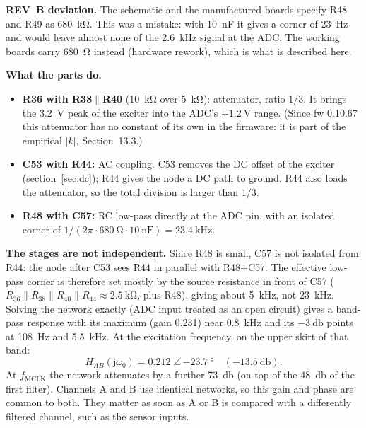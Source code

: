 \documentclass[11pt,a4paper]{article}
\begin{document}
\textbf{REV~B deviation.}  The schematic and the manufactured boards
specify R48 and R49 as \SI{680}{\kilo\ohm}.  This was a mistake: with
\SI{10}{\nano\farad} it gives a corner of \SI{23}{\hertz} and would leave
almost none of the \SI{2.6}{\kilo\hertz} signal at the ADC.  The working
boards carry \SI{680}{\ohm} instead (hardware rework), which is what is
described here.

\textbf{What the parts do.}
\begin{itemize}
  \item \textbf{R36 with R38$\parallel$R40} (\SI{10}{\kilo\ohm} over
        \SI{5}{\kilo\ohm}): attenuator, ratio $1/3$.  It brings the
        \SI{3.2}{\volt} peak of the exciter into the ADC's $\pm\SI{1.2}{\volt}$
        range.  (Since fw 0.10.67 this attenuator has no constant of its own in the
        firmware: it is part of the empirical $|k|$, Section~13.3.)
  \item \textbf{C53 with R44:} AC coupling.  C53 removes the DC offset of
        the exciter (section~\ref{sec:dc}); R44 gives the node a DC path to
        ground.  R44 also loads the attenuator, so the total division is
        larger than $1/3$.
  \item \textbf{R48 with C57:} RC low-pass directly at the ADC pin, with an
        isolated corner of $1/(2\pi\cdot\SI{680}{\ohm}\cdot\SI{10}{\nano\farad})
        = \SI{23.4}{\kilo\hertz}$.
\end{itemize}

\textbf{The stages are not independent.}  Since R48 is small, C57 is not
isolated from R44: the node after C53 sees R44 in parallel with R48+C57.  The
effective low-pass corner is therefore set mostly by the source resistance
in front of C57 ($R_{36}\parallel R_{38}\parallel R_{40}\parallel R_{44}
\approx\SI{2.5}{\kilo\ohm}$, plus R48), giving about \SI{5}{\kilo\hertz},
not \SI{23}{\kilo\hertz}.  Solving the network exactly (ADC input treated as
an open circuit) gives a band-pass response with its maximum
(gain 0.231) near \SI{0.8}{\kilo\hertz} and its $\SI{-3}{\decibel}$ points at
\SI{108}{\hertz} and \SI{5.5}{\kilo\hertz}.  At the excitation frequency,
on the upper skirt of that band:
\begin{equation}
  \boxed{H_{AB}(\mathrm{j}\omega_0) = 0.212\;\angle\,\SI{-23.7}{\degree}
  \quad(\SI{-13.5}{\decibel}).}
\end{equation}
At $f_{\mathrm{MCLK}}$ the network attenuates by a further
\SI{73}{\decibel} (on top of the \SI{48}{\decibel} of the first filter).
Channels A and B use identical networks, so this gain and phase are common
to both.  They matter as soon as A or B is compared with a differently
filtered channel, such as the sensor inputs.
\end{document}
